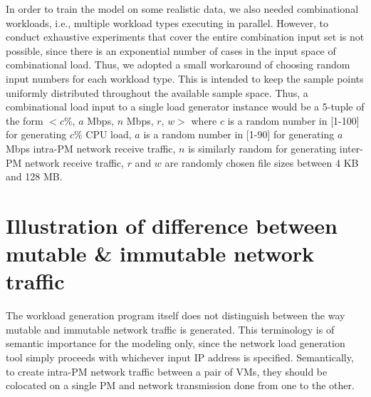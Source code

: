 In order to train the model on some realistic data, we also needed combinational workloads,
i.e., multiple workload types executing in parallel. However, to conduct exhaustive experiments
that cover the entire combination input set is not possible, since there is an exponential number
of cases in the input space of combinational load. Thus, we adopted a small workaround of
choosing random input numbers for each workload type. This is intended to keep the sample
points uniformly distributed throughout the available sample space. Thus, a combinational load
input to a single load generator instance would be a 5-tuple of the form $<c$\%, $a$ Mbps, $n$ Mbps,
$r$, $w>$ where $c$ is a random number in [1-100] for generating $c$\% CPU load, $a$ is a random number
in [1-90] for generating $a$ Mbps intra-PM network receive traffic, $n$ is similarly random for generating
inter-PM network receive traffic, $r$ and $w$ are randomly chosen file sizes between 4 KB and 128 MB.

\section{Illustration of difference between mutable \& immutable network traffic}
The workload generation program itself
does not distinguish between the way mutable and 
immutable
network traffic is generated. This terminology
is of semantic importance for the modeling only, 
since the network load generation tool simply
proceeds with whichever input IP address is specified. 
Semantically, to create intra-PM network traffic between a pair of VMs, 
they should be colocated on a single PM and network transmission
done from one to the other. 

